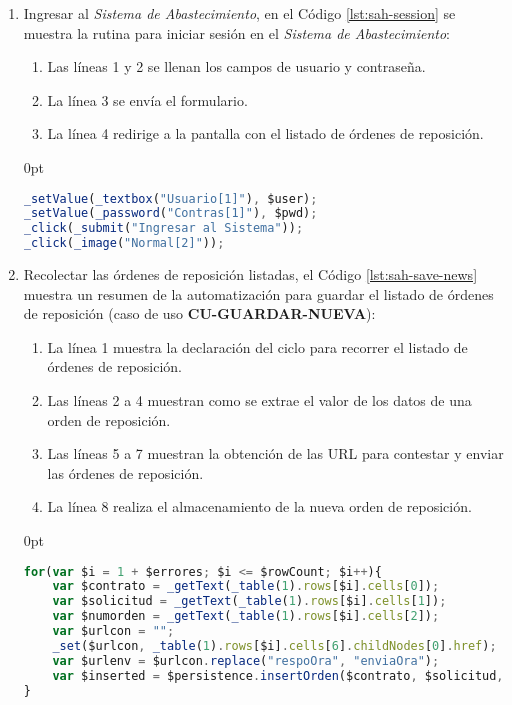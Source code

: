 \begin{enumerate}
	\item Ingresar al \textit{Sistema de Abastecimiento}, en el Código \ref{lst:sah-session} se muestra la rutina para iniciar sesión en el \textit{Sistema de Abastecimiento}:
	\begin{enumerate}
		\item Las líneas 1 y 2 se llenan los campos de usuario y contraseña.
		\item La línea 3 se envía el formulario.
		\item La línea 4 redirige a la pantalla con el listado de órdenes de reposición.  
	\end{enumerate}

\pagebreak
	\begin{adjustwidth}{\listingfixwidth}{0pt}
	\begin{lstlisting}[language=Javascript, caption={Inicio de sesión en el \textit{Sistema de Abastecimiento}.}, captionpos=b, label={lst:sah-session}]
_setValue(_textbox("Usuario[1]"), $user);
_setValue(_password("Contras[1]"), $pwd);
_click(_submit("Ingresar al Sistema"));
_click(_image("Normal[2]"));
	\end{lstlisting}
	\end{adjustwidth}

	\item Recolectar las órdenes de reposición listadas, el Código \ref{lst:sah-save-news} muestra un resumen de la automatización para guardar el listado de órdenes de reposición (caso de uso \textbf{CU-GUARDAR-NUEVA}):
	\begin{enumerate}
		\item La línea 1 muestra la declaración del ciclo para recorrer el listado de órdenes de reposición.
		\item Las líneas 2 a 4 muestran como se extrae el valor de los datos de una orden de reposición.
		\item Las líneas 5 a 7 muestran la obtención de las URL para contestar y enviar las órdenes de reposición.
		\item La línea 8 realiza el almacenamiento de la nueva orden de reposición. 
	\end{enumerate}
	\begin{adjustwidth}{\listingfixwidth}{0pt}
	\begin{lstlisting}[language=Javascript, caption={Guardar lista de órdenes de reposición.}, captionpos=b, label={lst:sah-save-news}]
for(var $i = 1 + $errores; $i <= $rowCount; $i++){
	var $contrato = _getText(_table(1).rows[$i].cells[0]);
	var $solicitud = _getText(_table(1).rows[$i].cells[1]);
	var $numorden = _getText(_table(1).rows[$i].cells[2]);
	var $urlcon = "";
	_set($urlcon, _table(1).rows[$i].cells[6].childNodes[0].href);
	var $urlenv = $urlcon.replace("respoOra", "enviaOra");
	var $inserted = $persistence.insertOrden($contrato, $solicitud, $numorden, $expedicion, $almacen, $urlcon, $urlenv, $idSesion);
}
	\end{lstlisting}
	\end{adjustwidth}


\end{enumerate}
